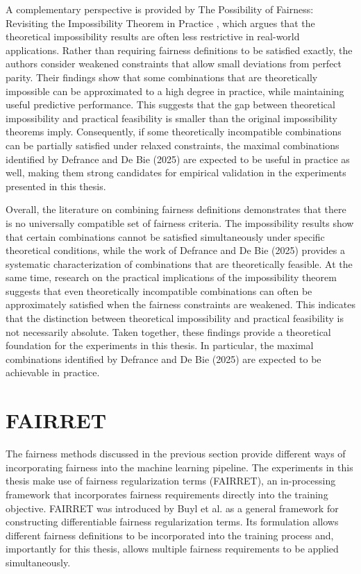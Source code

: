 
A complementary perspective is provided by The Possibility of Fairness: Revisiting the Impossibility Theorem in Practice \cite{bell}, which argues that the theoretical impossibility results are often less restrictive in real-world applications. Rather than requiring fairness definitions to be satisfied exactly, the authors consider weakened constraints that allow small deviations from perfect parity. Their findings show that some combinations that are theoretically impossible can be approximated to a high degree in practice, while maintaining useful predictive performance. This suggests that the gap between theoretical impossibility and practical feasibility is smaller than the original impossibility theorems imply. Consequently, if some theoretically incompatible combinations can be partially satisfied under relaxed constraints, the maximal combinations identified by Defrance and De Bie (2025) are expected to be useful in practice as well, making them strong candidates for empirical validation in the experiments presented in this thesis.

Overall, the literature on combining fairness definitions demonstrates that there is no universally compatible set of fairness criteria. The impossibility results show that certain combinations cannot be satisfied simultaneously under specific theoretical conditions, while the work of Defrance and De Bie (2025) \cite{max_combinations} provides a systematic characterization of combinations that are theoretically feasible. At the same time, research on the practical implications of the impossibility theorem suggests that even theoretically incompatible combinations can often be approximately satisfied when the fairness constraints are weakened. This indicates that the distinction between theoretical impossibility and practical feasibility is not necessarily absolute. Taken together, these findings provide a theoretical foundation for the experiments in this thesis. In particular, the maximal combinations identified by Defrance and De Bie (2025) are expected to be achievable in practice.

\section{FAIRRET}
The fairness methods discussed in the previous section provide different ways of incorporating fairness into the machine learning pipeline. The experiments in this thesis make use of  fairness regularization terms (FAIRRET), an in-processing framework that incorporates fairness requirements directly into the training objective. FAIRRET was introduced by Buyl et al. \cite{fairret} as a general framework for constructing differentiable fairness regularization terms. Its formulation allows different fairness definitions to be incorporated into the training process and, importantly for this thesis, allows multiple fairness requirements to be applied simultaneously.

